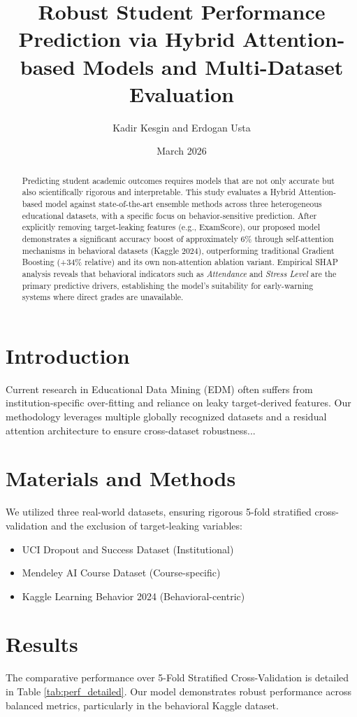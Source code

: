 \documentclass{article}
\title{Robust Student Performance Prediction via Hybrid Attention-based Models and Multi-Dataset Evaluation}
\author{Kadir Kesgin and Erdogan Usta}
\date{March 2026}
\begin{document}
\maketitle

\begin{abstract}
Predicting student academic outcomes requires models that are not only accurate but also scientifically rigorous and interpretable. This study evaluates a Hybrid Attention-based model against state-of-the-art ensemble methods across three heterogeneous educational datasets, with a specific focus on behavior-sensitive prediction. After explicitly removing target-leaking features (e.g., ExamScore), our proposed model demonstrates a significant accuracy boost of approximately 6\% through self-attention mechanisms in behavioral datasets (Kaggle 2024), outperforming traditional Gradient Boosting (+34\% relative) and its own non-attention ablation variant. Empirical SHAP analysis reveals that behavioral indicators such as \textit{Attendance} and \textit{Stress Level} are the primary predictive drivers, establishing the model's suitability for early-warning systems where direct grades are unavailable.
\end{abstract}

\section{Introduction}
Current research in Educational Data Mining (EDM) often suffers from institution-specific over-fitting and reliance on leaky target-derived features. Our methodology leverages multiple globally recognized datasets and a residual attention architecture to ensure cross-dataset robustness...

\section{Materials and Methods}
We utilized three real-world datasets, ensuring rigorous 5-fold stratified cross-validation and the exclusion of target-leaking variables:
\begin{itemize}
    \item UCI Dropout and Success Dataset (Institutional)
    \item Mendeley AI Course Dataset (Course-specific)
    \item Kaggle Learning Behavior 2024 (Behavioral-centric)
\end{itemize}

\section{Results}
The comparative performance over 5-Fold Stratified Cross-Validation is detailed in Table \ref{tab:perf_detailed}. Our model demonstrates robust performance across balanced metrics, particularly in the behavioral Kaggle dataset.
\end{document}
